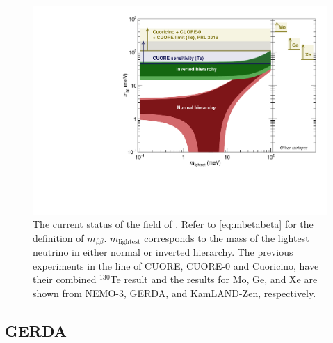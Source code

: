 \begin{figure}[htbp]
\centering
\includegraphics[width=0.7\linewidth]{Figures/M_bb_vs_mlightest_CL_2018.pdf}
\caption[The current status of the field of \zeronubb.]
{The current status of the field of \zeronubb.
Refer to  \autoref{eq:mbetabeta} for the definition of $m_{\beta\beta}$.
$m_{\textrm{lightest}}$ corresponds to the mass of the lightest neutrino in either normal or inverted hierarchy.
The previous experiments in the line of CUORE, CUORE-0 and Cuoricino, have their combined $^{130}$Te result and the results for Mo, Ge, and Xe are shown from NEMO-3, GERDA, and KamLAND-Zen, respectively.}
\label{fig:cuore-mbetabeta}
\end{figure}

\subsection{GERDA}

